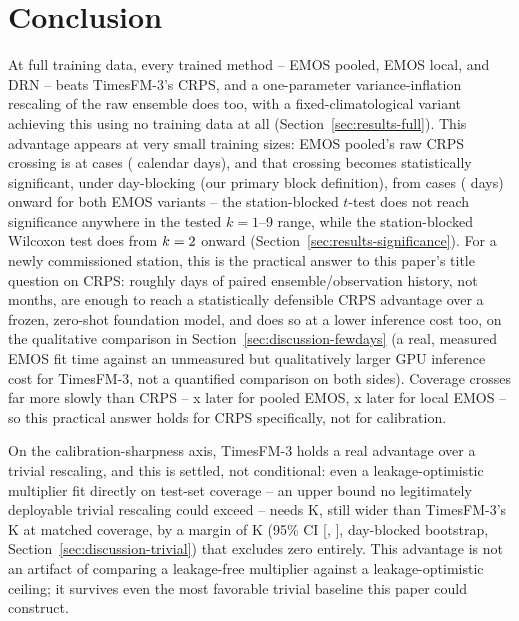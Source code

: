 \section{Conclusion}
\label{sec:conclusion}

At full training data, every trained method -- EMOS pooled, EMOS local,
and DRN -- beats TimesFM-3's CRPS, and a one-parameter variance-inflation
rescaling of the raw ensemble does too, with a fixed-climatological
variant achieving this using no training data at all
(Section~\ref{sec:results-full}). This advantage appears at very small
training sizes: EMOS pooled's raw CRPS crossing is at
\BpCrpsPooledCases{} cases (\BpCrpsPooledDays{} calendar days), and that
crossing becomes statistically significant, under day-blocking (our
primary block definition), from \BpCrpsPooledSigK{} cases
(\BpCrpsPooledSigDays{} days) onward for both EMOS variants -- the
station-blocked \(t\)-test does not reach significance anywhere in the
tested \(k=1\)--9 range, while the station-blocked Wilcoxon test does
from \(k=2{}\) onward
(Section~\ref{sec:results-significance}). For a newly commissioned
station, this is the practical answer to this paper's title question on
CRPS: roughly \BpCrpsPooledSigDays{} days of paired ensemble/observation
history, not months, are enough to reach a statistically defensible CRPS
advantage over a frozen, zero-shot foundation model, and does so at a
lower inference cost too, on the qualitative comparison in
Section~\ref{sec:discussion-fewdays} (a real, measured EMOS fit time
against an unmeasured but qualitatively larger GPU inference cost for
TimesFM-3, not a quantified comparison on both sides). Coverage crosses
far more slowly
than CRPS -- \CoverageCrpsRatioPooled{}x later for pooled EMOS,
\CoverageCrpsRatioLocal{}x later for local EMOS -- so this practical
answer holds for CRPS specifically, not for calibration.

On the calibration-sharpness axis, TimesFM-3 holds a real advantage over
a trivial rescaling, and this is settled, not conditional: even a
leakage-optimistic multiplier fit directly on test-set coverage -- an
upper bound no legitimately deployable trivial rescaling could exceed --
needs \InflLeakyWidth{} K, still wider than TimesFM-3's \WidthTsfmFull{}
K at matched coverage, by a margin of \InflLeakyWidthDiffPoint{} K (95\%
CI [\InflLeakyWidthDiffCiLow{}, \InflLeakyWidthDiffCiHigh{}],
day-blocked bootstrap, Section~\ref{sec:discussion-trivial}) that
excludes zero entirely. This advantage is not an
artifact of comparing a leakage-free multiplier against a
leakage-optimistic ceiling; it survives even the most favorable trivial
baseline this paper could construct.

